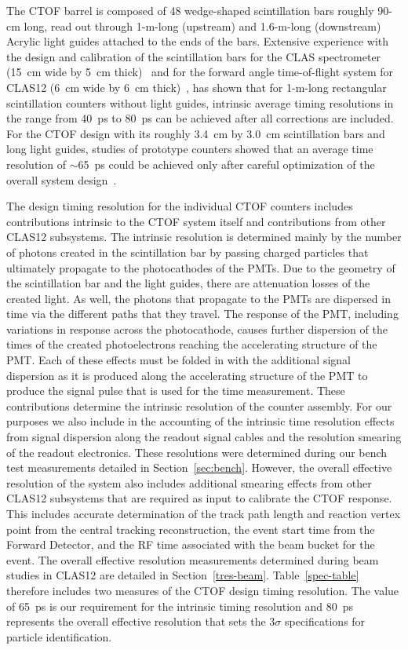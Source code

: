 \documentclass{elsart}
\begin{document}
The CTOF barrel is composed of 48 wedge-shaped scintillation bars roughly 90-cm long, read out
through 1-m-long (upstream) and 1.6-m-long (downstream) Acrylic light guides attached to the 
ends of the bars. Extensive experience with the design and calibration of the scintillation bars for 
the CLAS spectrometer (15~cm wide by 5~cm thick)~\cite{tof-nim} and for the forward angle 
time-of-flight system for CLAS12 (6~cm wide by 6~cm thick)~\cite{ftof-ref}, has shown that for 
1-m-long rectangular scintillation counters without light guides, intrinsic average timing resolutions
in the range from 40~ps to 80~ps can be achieved after all corrections are included. For the CTOF
design with its roughly 3.4~cm by 3.0~cm scintillation bars and long light guides, studies of prototype
counters showed that an average time resolution of $\sim$65~ps could be achieved only after careful
optimization of the overall system design~\cite{baturin-2009}.

The design timing resolution for the individual CTOF counters includes contributions intrinsic to the
CTOF system itself and contributions from other CLAS12 subsystems. The intrinsic resolution
is determined mainly by the number of photons created in the scintillation bar by passing charged
particles that ultimately propagate to the photocathodes of the PMTs. Due to the geometry of the
scintillation bar and the light guides, there are attenuation losses of the created light. As well, the
photons that propagate to the PMTs are dispersed in time via the different paths that they travel.
The response of the PMT, including variations in response across the photocathode, causes further
dispersion of the times of the created photoelectrons reaching the accelerating structure of the PMT.
Each of these effects must be folded in with the additional signal dispersion as it is produced along the
accelerating structure of the PMT to produce the signal pulse that is used for the time measurement.
These contributions determine the intrinsic resolution of the counter assembly. For our purposes we also
include in the accounting of the intrinsic time resolution effects from signal dispersion along the readout
signal cables and the resolution smearing of the readout electronics. These resolutions were determined
during our bench test measurements detailed in Section~\ref{sec:bench}. However, the overall effective
resolution of the system also includes additional smearing effects from other CLAS12 subsystems that
are required as input to calibrate the CTOF response. This includes accurate determination of the track
path length and reaction vertex point from the central tracking reconstruction, the event start time from
the Forward Detector, and the RF time associated with the beam bucket for the event. The overall
effective resolution measurements determined during beam studies in CLAS12 are detailed in
Section~\ref{tres-beam}. Table~\ref{spec-table} therefore includes two measures of the CTOF design
timing resolution. The value of 65~ps is our requirement for the intrinsic timing resolution and 80~ps
represents the overall effective resolution that sets the 3$\sigma$ specifications for particle
identification.
\end{document}

